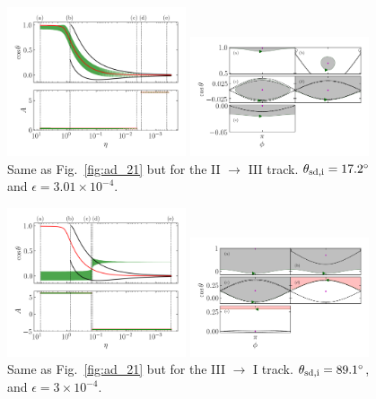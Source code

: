 \begin{figure}
    \centering
    \includegraphics[width=0.47\textwidth]{plots_diskdisp/3testo23.png}

    \includegraphics[width=0.47\textwidth]{plots_diskdisp/3testo23_subplots.png}
    \caption{Same as Fig.~\ref{fig:ad_21} but for the II $\to$ III track.
    $\theta_{\rm sd, i} = 17.2^\circ$ and $\epsilon = 3.01 \times
    10^{-4}$.}\label{fig:ad_23}
\end{figure}
\begin{figure}
    \centering
    \includegraphics[width=0.47\textwidth]{plots_diskdisp/3testo31.png}

    \includegraphics[width=0.47\textwidth]{plots_diskdisp/3testo31_subplots.png}
    \caption{Same as Fig.~\ref{fig:ad_21} but for the III $\to$ I track.
    $\theta_{\rm sd, i} = 89.1^\circ$, and $\epsilon = 3 \times
    10^{-4}$.}\label{fig:ad_31}
\end{figure}
